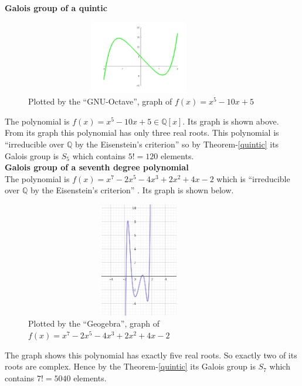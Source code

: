 \documentclass[a4paper,twoside,10pt]{article}
\theoremstyle{plain}
\theoremstyle{definition}
\begin{document}
\textbf{Galois group of a quintic}\\

\begin{figure}[h!]
  \centering
  \label{quintic-fig}
  \includegraphics[width=10cm, height=3.2cm]{quantic2.png}
  \caption{\footnotesize Plotted by the ``GNU-Octave'', graph of \(f(x)=x^5-10x+5\) }
\end{figure}
\noindent
The polynomial is \(f(x)=x^5-10x+5 \in \mathbb{Q}[x]\). Its graph is shown above.  From its graph this polynomial has only three real roots. This polynomial is ``irreducible over \(\mathbb{Q}\) by the Eisenstein's criterion'' \cite{hunger} so by Theorem-{\ref{quintic}} its Galois group is \(S_5\) which contains \(5!=120\) elements.\\

\noindent
\textbf{Galois group of a seventh degree polynomial}\\
The polynomial is \(f(x)=x^7-2x^5-4x^3+2x^2+4x-2\) which is ``irreducible over \(\mathbb{Q}\) by the Eisenstein's criterion'' \cite{hunger}. Its graph is shown below.

\begin{figure}[h!]
  \centering
  \includegraphics[width=10cm, height=5cm]{seventh2.png}
  \caption{\footnotesize Plotted by the ``Geogebra'', graph of \(f(x)=x^7-2x^5-4x^3+2x^2+4x-2\)}
\end{figure}

\noindent
The graph shows this polynomial has exactly five real roots. So exactly two of its roots are complex. Hence by the Theorem-\ref{quintic} its Galois group is \(S_7\) which contains \(7!=5040\) elements. \\[4mm]
\end{document}
